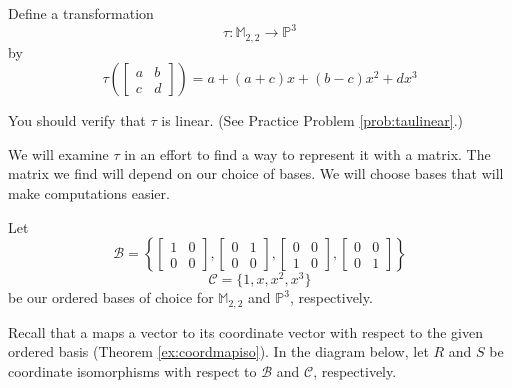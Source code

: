 \documentclass{ximera}
\begin{document}
\begin{exploration}\label{init:taumatrix}
Define a transformation 
$$\tau:\mathbb{M}_{2,2}\rightarrow\mathbb{P}^3$$
by
$$\tau\left(\begin{bmatrix}a&b\\c&d\end{bmatrix}\right)=a+(a+c)x+(b-c)x^2+dx^3$$

You should verify that $\tau$ is linear.  (See Practice Problem \ref{prob:taulinear}.)

We will examine $\tau$ in an effort to find a way to represent it with a matrix.  The matrix we find will depend on our choice of bases.  We will choose bases that will make computations easier.



Let 
$$\mathcal{B}=\left\{\begin{bmatrix}1&0\\0&0\end{bmatrix}, \begin{bmatrix}0&1\\0&0\end{bmatrix}, \begin{bmatrix}0&0\\1&0\end{bmatrix}, \begin{bmatrix}0&0\\0&1\end{bmatrix}\right\}$$
$$\mathcal{C}=\{1, x, x^2, x^3\}$$
be our ordered bases of choice for $\mathbb{M}_{2,2}$ and $\mathbb{P}^3$, respectively.

Recall that a  maps a vector to its coordinate vector with respect to the given ordered basis (Theorem \ref{ex:coordmapiso}).  In the diagram below, let $R$ and $S$ be coordinate isomorphisms with respect to $\mathcal{B}$ and $\mathcal{C}$, respectively.

\begin{center}
\end{center}
\end{exploration}
\end{document}
